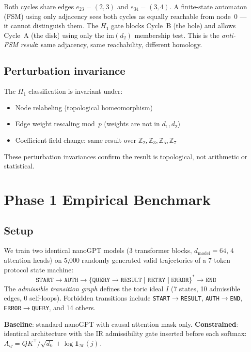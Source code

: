 \documentclass[11pt,a4paper]{article}
\begin{document}
Both cycles share edges $e_{23}=(2,3)$ and $e_{34}=(3,4)$.
A finite-state automaton (FSM) using only adjacency sees both cycles
as equally reachable from node~0 --- it cannot distinguish them.
The $H_1$ gate blocks Cycle~B (the hole) and allows Cycle~A (the disk)
using only the $\mathrm{im}(d_2)$ membership test.
This is the \emph{anti-FSM result}: same adjacency, same reachability,
different homology.

\subsection{Perturbation invariance}

The $H_1$ classification is invariant under:
\begin{itemize}
  \item Node relabeling (topological homeomorphism)
  \item Edge weight rescaling mod~$p$ (weights are not in $d_1, d_2$)
  \item Coefficient field change: same result over $\mathbb{Z}_2, \mathbb{Z}_3,
        \mathbb{Z}_5, \mathbb{Z}_7$
\end{itemize}
These perturbation invariances confirm the result is topological,
not arithmetic or statistical.

\section{Phase 1 Empirical Benchmark}
\label{sec:benchmark}

\subsection{Setup}

We train two identical nanoGPT models (3 transformer blocks,
$d_\mathrm{model}=64$, 4 attention heads) on 5,000 randomly
generated valid trajectories of a 7-token protocol state machine:
\[
  \texttt{START} \to \texttt{AUTH} \to
  \{\texttt{QUERY} \to \texttt{RESULT} \mid \texttt{RETRY} \mid
    \texttt{ERROR}\}^* \to \texttt{END}
\]
The \emph{admissible transition graph} defines the toric ideal $I$
(7 states, 10 admissible edges, 0 self-loops).
Forbidden transitions include \texttt{START}$\to$\texttt{RESULT},
\texttt{AUTH}$\to$\texttt{END}, \texttt{ERROR}$\to$\texttt{QUERY},
and 14 others.

\textbf{Baseline}: standard nanoGPT with causal attention mask only.
\textbf{Constrained}: identical architecture with the IR admissibility
gate inserted before each softmax:
$A_{ij} = QK^\top/\sqrt{d_k} + \log\mathbf{1}_\mathcal{M}(j)$.
\end{document}
